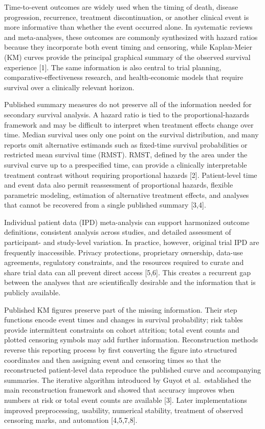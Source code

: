 \documentclass[
  english,
  letterpaper,
  DIV=11,
  numbers=noendperiod]{scrartcl}
\begin{document}
Time-to-event outcomes are widely used when the timing of death, disease
progression, recurrence, treatment discontinuation, or another clinical
event is more informative than whether the event occurred alone. In
systematic reviews and meta-analyses, these outcomes are commonly
synthesized with hazard ratios because they incorporate both event
timing and censoring, while Kaplan-Meier (KM) curves provide the
principal graphical summary of the observed survival experience {[}1{]}.
The same information is also central to trial planning,
comparative-effectiveness research, and health-economic models that
require survival over a clinically relevant horizon.

Published summary measures do not preserve all of the information needed
for secondary survival analysis. A hazard ratio is tied to the
proportional-hazards framework and may be difficult to interpret when
treatment effects change over time. Median survival uses only one point
on the survival distribution, and many reports omit alternative
estimands such as fixed-time survival probabilities or restricted mean
survival time (RMST). RMST, defined by the area under the survival curve
up to a prespecified time, can provide a clinically interpretable
treatment contrast without requiring proportional hazards {[}2{]}.
Patient-level time and event data also permit reassessment of
proportional hazards, flexible parametric modeling, estimation of
alternative treatment effects, and analyses that cannot be recovered
from a single published summary {[}3,4{]}.

Individual patient data (IPD) meta-analysis can support harmonized
outcome definitions, consistent analysis across studies, and detailed
assessment of participant- and study-level variation. In practice,
however, original trial IPD are frequently inaccessible. Privacy
protections, proprietary ownership, data-use agreements, regulatory
constraints, and the resources required to curate and share trial data
can all prevent direct access {[}5,6{]}. This creates a recurrent gap
between the analyses that are scientifically desirable and the
information that is publicly available.

Published KM figures preserve part of the missing information. Their
step functions encode event times and changes in survival probability;
risk tables provide intermittent constraints on cohort attrition; total
event counts and plotted censoring symbols may add further information.
Reconstruction methods reverse this reporting process by first
converting the figure into structured coordinates and then assigning
event and censoring times so that the reconstructed patient-level data
reproduce the published curve and accompanying summaries. The iterative
algorithm introduced by Guyot et al.~established the main reconstruction
framework and showed that accuracy improves when numbers at risk or
total event counts are available {[}3{]}. Later implementations improved
preprocessing, usability, numerical stability, treatment of observed
censoring marks, and automation {[}4,5,7,8{]}.
\end{document}
